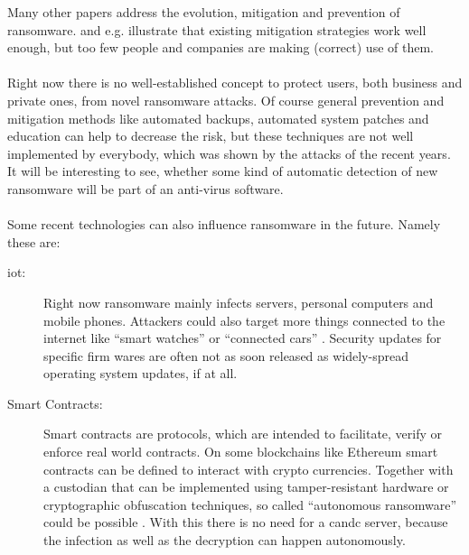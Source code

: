 Many other papers address the evolution, mitigation and prevention of ransomware. \cite{Shinde2016} and \cite{Richardson2017} e.g. illustrate that existing mitigation strategies work well enough, but too few people and companies are making (correct) use of them.\\
\\
Right now there is no well-established concept to protect users, both business and private ones, from novel ransomware attacks. Of course general prevention and mitigation methods like automated backups, automated system patches and education can help to decrease the risk, but these techniques are not well implemented by everybody, which was shown by the attacks of the recent years. It will be interesting to see, whether some kind of automatic detection of new ransomware will be part of an anti-virus software. \\
\\
Some recent technologies can also influence ransomware in the future. Namely these are:

\begin{description}
\item[\gls{iot}:] Right now ransomware mainly infects servers, personal computers and mobile phones. Attackers could also target more things connected to the internet like ``smart watches'' or ``connected cars'' \cite{Cobb2017}. Security updates for specific firm wares are often not as soon released as widely-spread operating system updates, if at all.
\item[Smart Contracts:] Smart contracts are protocols, which are intended to facilitate, verify or enforce real world contracts. On some blockchains like Ethereum smart contracts can be defined to interact with crypto currencies. Together with a custodian that can be implemented using tamper-resistant hardware or cryptographic obfuscation techniques, so called ``autonomous ransomware'' could be possible \cite{Kaptchuk2017}\cite{Juels2016}. With this there is no need for a \gls{candc} server, because the infection as well as the decryption can happen autonomously.
\end{description} 

